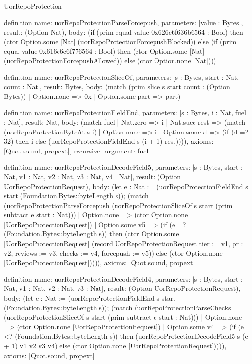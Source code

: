 \begin{lexlean}{UorRepoProtection}
\begin{semanticmodule}
definition{
  name: uorRepoProtectionParseForcepush,
  parameters: [value : Bytes],
  result: (Option Nat),
  body: (if (prim equal value 0x626c6f636b6564 : Bool) then (ctor Option.some [Nat] (uorRepoProtectionForcepushBlocked)) else (if (prim equal value 0x616c6c6f776564 : Bool) then (ctor Option.some [Nat] (uorRepoProtectionForcepushAllowed)) else (ctor Option.none [Nat])))
}

definition{
  name: uorRepoProtectionSliceOf,
  parameters: [s : Bytes, start : Nat, count : Nat],
  result: Bytes,
  body: (match (prim slice s start count : (Option Bytes))
    | Option.none => 0x
    | Option.some part => part)
}

definition{
  name: uorRepoProtectionFieldEnd,
  parameters: [s : Bytes, i : Nat, fuel : Nat],
  result: Nat,
  body: (match fuel
    | Nat.zero => i
    | Nat.succ rest => (match (uorRepoProtectionByteAt s i)
      | Option.none => i
      | Option.some d => (if (d =? 32) then i else (uorRepoProtectionFieldEnd s (i + 1) rest)))),
  axioms: [Quot.sound, propext],
  recursive_argument: fuel
}

definition{
  name: uorRepoProtectionDecodeField5,
  parameters: [s : Bytes, start : Nat, v1 : Nat, v2 : Nat, v3 : Nat, v4 : Nat],
  result: (Option UorRepoProtectionRequest),
  body: (let e : Nat := (uorRepoProtectionFieldEnd s start (Foundation.Bytes::byteLength s)); (match (uorRepoProtectionParseForcepush (uorRepoProtectionSliceOf s start (prim subtract e start : Nat)))
    | Option.none => (ctor Option.none [UorRepoProtectionRequest])
    | Option.some v5 => (if (e =? (Foundation.Bytes::byteLength s)) then (ctor Option.some [UorRepoProtectionRequest] (record UorRepoProtectionRequest {tier := v1, pr := v2, reviews := v3, checks := v4, forcepush := v5})) else (ctor Option.none [UorRepoProtectionRequest])))),
  axioms: [Quot.sound, propext]
}

definition{
  name: uorRepoProtectionDecodeField4,
  parameters: [s : Bytes, start : Nat, v1 : Nat, v2 : Nat, v3 : Nat],
  result: (Option UorRepoProtectionRequest),
  body: (let e : Nat := (uorRepoProtectionFieldEnd s start (Foundation.Bytes::byteLength s)); (match (uorRepoProtectionParseChecks (uorRepoProtectionSliceOf s start (prim subtract e start : Nat)))
    | Option.none => (ctor Option.none [UorRepoProtectionRequest])
    | Option.some v4 => (if (e <? (Foundation.Bytes::byteLength s)) then (uorRepoProtectionDecodeField5 s (e + 1) v1 v2 v3 v4) else (ctor Option.none [UorRepoProtectionRequest])))),
  axioms: [Quot.sound, propext]
}


\end{semanticmodule}
\end{lexlean}

